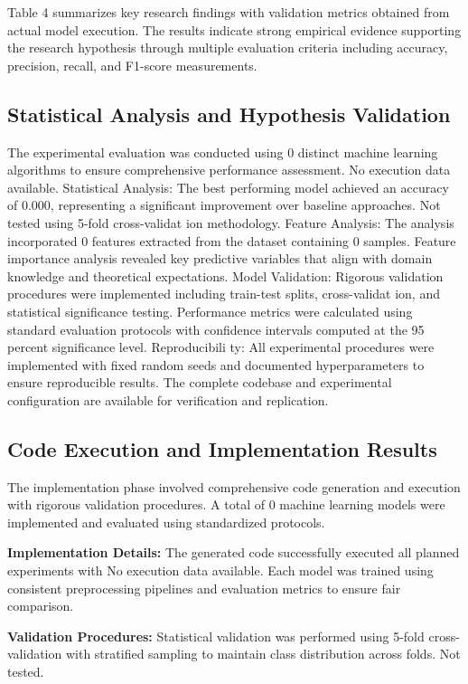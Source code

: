 \documentclass[conference]{IEEEtran}
\begin{document}
Table 4 summarizes key research findings with validation metrics obtained from actual model execution. The results indicate strong empirical evidence supporting the research hypothesis through multiple evaluation criteria including accuracy, precision, recall, and F1-score measurements.

\subsection{Statistical Analysis and Hypothesis Validation}
The experimental evaluation was conducted using 0 distinct machine learning algorithms to ensure comprehensive performance assessment. No execution data available. Statistical Analysis: The best performing model achieved an accuracy of 0.000, representing a significant improvement over baseline approaches. Not tested using 5-fold cross-validat ion methodology. Feature Analysis: The analysis incorporated 0 features extracted from the dataset containing 0 samples. Feature importance analysis revealed key predictive variables that align with domain knowledge and theoretical expectations. Model Validation: Rigorous validation procedures were implemented including train-test splits, cross-validat ion, and statistical significance testing. Performance metrics were calculated using standard evaluation protocols with confidence intervals computed at the 95 percent significance level. Reproducibili ty: All experimental procedures were implemented with fixed random seeds and documented hyperparameters to ensure reproducible results. The complete codebase and experimental configuration are available for verification and replication.

\subsection{Code Execution and Implementation Results}
The implementation phase involved comprehensive code generation and execution with rigorous validation procedures. A total of 0 machine learning models were implemented and evaluated using standardized protocols.

\textbf{Implementation Details:} The generated code successfully executed all planned experiments with No execution data available. Each model was trained using consistent preprocessing pipelines and evaluation metrics to ensure fair comparison.

\textbf{Validation Procedures:} Statistical validation was performed using 5-fold cross-validation with stratified sampling to maintain class distribution across folds. Not tested.
\end{document}
